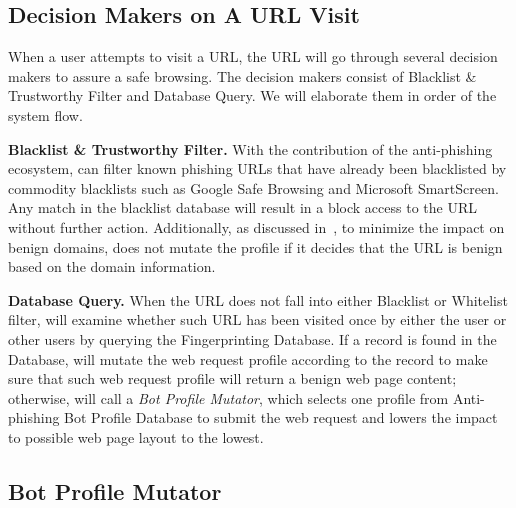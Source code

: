 \subsection{Decision Makers on A URL Visit}

When a user attempts to visit a URL, the URL will go through several decision makers to assure a safe browsing.
The decision makers consist of Blacklist \& Trustworthy Filter and Database Query.
We will elaborate them in order of the system flow.

\noindent
\textbf{Blacklist \& Trustworthy Filter.}
With the contribution of the anti-phishing ecosystem, \spartacus can filter known phishing URLs that have already been blacklisted by commodity blacklists such as Google Safe Browsing and Microsoft SmartScreen.
Any match in the blacklist database will result in a block access to the URL without further action.
Additionally, as discussed in~, to minimize the impact on benign domains, \spartacus does not mutate the profile if it decides that the URL is benign based on the domain information.


\noindent
\textbf{Database Query.}
When the URL does not fall into either Blacklist or Whitelist filter, \spartacus will examine whether such URL has been visited once by either the user or other users by querying the Fingerprinting Database.
If a record is found in the Database, \spartacus will mutate the web request profile according to the record to make sure that such web request profile will return a benign web page content;
otherwise, \spartacus will call a \emph{Bot Profile Mutator}, which selects one profile from Anti-phishing Bot Profile Database to submit the web request and lowers the impact to possible web page layout to the lowest.



\subsection{Bot Profile Mutator}

